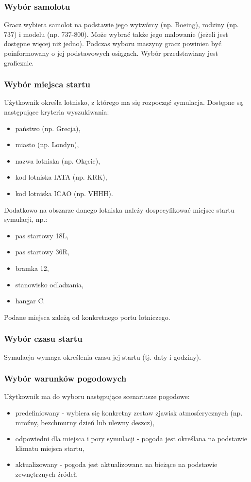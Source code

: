 \documentclass{mwrep}
\begin{document}
\subsubsection{Wybór samolotu}
Gracz wybiera samolot na podstawie jego wytwórcy (np. Boeing), rodziny (np. 737) i modelu (np. 737-800). Może wybrać także jego malowanie (jeżeli jest dostępne więcej niż jedno). Podczas wyboru maszyny gracz powinien być poinformowany o jej podstawowych osiągach. Wybór przedstawiany jest graficznie.

\subsubsection{Wybór miejsca startu}
Użytkownik określa lotnisko, z którego ma się rozpocząć symulacja. Dostępne są następujące kryteria wyszukiwania:
\begin{itemize}
\item państwo (np. Grecja),
\item miasto (np. Londyn),
\item nazwa lotniska (np. Okęcie),
\item kod lotniska IATA (np. KRK),
\item kod lotniska ICAO (np. VHHH).
\end{itemize}
Dodatkowo na obszarze danego lotniska należy dospecyfikować miejsce startu symulacji, np.:
\begin{itemize}
\item pas startowy 18L,
\item pas startowy 36R,
\item bramka 12,
\item stanowisko odladzania,
\item hangar C.
\end{itemize}
Podane miejsca zależą od konkretnego portu lotniczego.

\subsubsection{Wybór czasu startu}
Symulacja wymaga określenia czasu jej startu (tj. daty i godziny).

\subsubsection{Wybór warunków pogodowych}
Użytkownik ma do wyboru następujące scenariusze pogodowe:
\begin{itemize}
\item predefiniowany - wybiera się konkretny zestaw zjawisk atmosferycznych (np. mroźny, bezchmurny dzień lub ulewny deszcz),
\item odpowiedni dla miejsca i pory symulacji - pogoda jest określana na podstawie klimatu miejsca startu,
\item aktualizowany - pogoda jest aktualizowana na bieżące na podstawie zewnętrznych źródeł.
\end{itemize}
\end{document}
